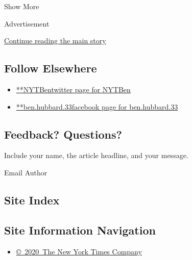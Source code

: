 Show More

Advertisement

\protect\hyperlink{after-mid2}{Continue reading the main story}

\hypertarget{follow-elsewhere}{%
\subsection{Follow Elsewhere}\label{follow-elsewhere}}

\begin{itemize}
\tightlist
\item
  \href{https://twitter.com/NYTBen}{**NYTBentwitter page for NYTBen}
\item
  \href{https://www.facebookcorewwwi.onion/ben.hubbard.33}{**ben.hubbard.33facebook
  page for ben.hubbard.33}
\end{itemize}

\hypertarget{feedback-questions}{%
\subsection{Feedback? Questions?}\label{feedback-questions}}

Include your name, the article headline, and your message.

Email Author

\hypertarget{site-index}{%
\subsection{Site Index}\label{site-index}}

\hypertarget{site-information-navigation}{%
\subsection{Site Information
Navigation}\label{site-information-navigation}}

\begin{itemize}
\tightlist
\item
  \href{https://help.nytimes3xbfgragh.onion/hc/en-us/articles/115014792127-Copyright-notice}{©~2020~The
  New York Times Company}
\end{itemize}

